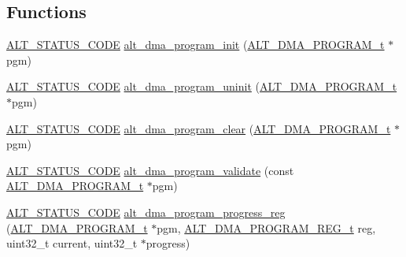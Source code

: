 \subsection*{Functions}
\begin{DoxyCompactItemize}
\item 
\mbox{\hyperlink{hwlib_8h_abdb0d369f069723ca55d6c94bcaaaa12}{A\+L\+T\+\_\+\+S\+T\+A\+T\+U\+S\+\_\+\+C\+O\+DE}} \mbox{\hyperlink{group__ALT__DMA__PRG_ga6d650aaadda9cd2df796965d1d7c0308}{alt\+\_\+dma\+\_\+program\+\_\+init}} (\mbox{\hyperlink{group__ALT__DMA__PRG_gadb7028531574894854db4db6d797de97}{A\+L\+T\+\_\+\+D\+M\+A\+\_\+\+P\+R\+O\+G\+R\+A\+M\+\_\+t}} $\ast$pgm)
\item 
\mbox{\hyperlink{hwlib_8h_abdb0d369f069723ca55d6c94bcaaaa12}{A\+L\+T\+\_\+\+S\+T\+A\+T\+U\+S\+\_\+\+C\+O\+DE}} \mbox{\hyperlink{group__ALT__DMA__PRG_gaa13d0013fb1a4e58d688c89fe34ca3ab}{alt\+\_\+dma\+\_\+program\+\_\+uninit}} (\mbox{\hyperlink{group__ALT__DMA__PRG_gadb7028531574894854db4db6d797de97}{A\+L\+T\+\_\+\+D\+M\+A\+\_\+\+P\+R\+O\+G\+R\+A\+M\+\_\+t}} $\ast$pgm)
\item 
\mbox{\hyperlink{hwlib_8h_abdb0d369f069723ca55d6c94bcaaaa12}{A\+L\+T\+\_\+\+S\+T\+A\+T\+U\+S\+\_\+\+C\+O\+DE}} \mbox{\hyperlink{group__ALT__DMA__PRG_gaf8ff0cd45014cac3b97be0cf42361551}{alt\+\_\+dma\+\_\+program\+\_\+clear}} (\mbox{\hyperlink{group__ALT__DMA__PRG_gadb7028531574894854db4db6d797de97}{A\+L\+T\+\_\+\+D\+M\+A\+\_\+\+P\+R\+O\+G\+R\+A\+M\+\_\+t}} $\ast$pgm)
\item 
\mbox{\hyperlink{hwlib_8h_abdb0d369f069723ca55d6c94bcaaaa12}{A\+L\+T\+\_\+\+S\+T\+A\+T\+U\+S\+\_\+\+C\+O\+DE}} \mbox{\hyperlink{group__ALT__DMA__PRG_ga343dc12136a69b61aadcfed3c6129493}{alt\+\_\+dma\+\_\+program\+\_\+validate}} (const \mbox{\hyperlink{group__ALT__DMA__PRG_gadb7028531574894854db4db6d797de97}{A\+L\+T\+\_\+\+D\+M\+A\+\_\+\+P\+R\+O\+G\+R\+A\+M\+\_\+t}} $\ast$pgm)
\item 
\mbox{\hyperlink{hwlib_8h_abdb0d369f069723ca55d6c94bcaaaa12}{A\+L\+T\+\_\+\+S\+T\+A\+T\+U\+S\+\_\+\+C\+O\+DE}} \mbox{\hyperlink{group__ALT__DMA__PRG_ga77683309810874ecf93ce10a49f40094}{alt\+\_\+dma\+\_\+program\+\_\+progress\+\_\+reg}} (\mbox{\hyperlink{group__ALT__DMA__PRG_gadb7028531574894854db4db6d797de97}{A\+L\+T\+\_\+\+D\+M\+A\+\_\+\+P\+R\+O\+G\+R\+A\+M\+\_\+t}} $\ast$pgm, \mbox{\hyperlink{group__ALT__DMA__PRG_ga772371a3d6334e110911154cf94950e8}{A\+L\+T\+\_\+\+D\+M\+A\+\_\+\+P\+R\+O\+G\+R\+A\+M\+\_\+\+R\+E\+G\+\_\+t}} reg, uint32\+\_\+t current, uint32\+\_\+t $\ast$progress)
\item 

\end{DoxyCompactItemize}
